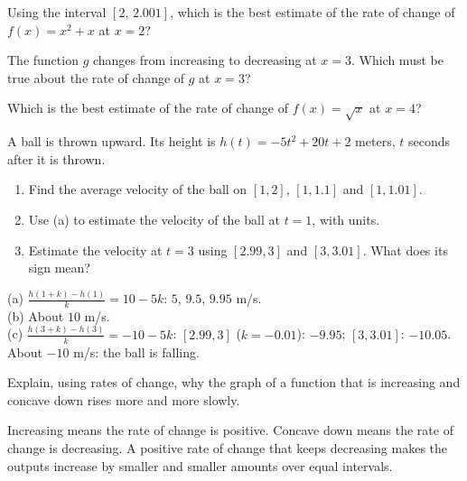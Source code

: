 \begin{exo}{}
Using the interval $[2,\,2.001]$, which is the best estimate of the rate of change of $f(x)=x^2+x$ at $x=2$?
\end{exo}
\begin{exo}{}
The function $g$ changes from increasing to decreasing at $x=3$. Which must be true about the rate of change of $g$ at $x=3$?
\end{exo}
\begin{exo}{\calcreq}
Which is the best estimate of the rate of change of $f(x)=\sqrt{x}$ at $x=4$?
\end{exo}
\begin{exo}{}
A ball is thrown upward. Its height is $h(t)=-5t^2+20t+2$ meters, $t$ seconds after it is thrown.
\begin{enumerate}[label=(\alph*)]
\item Find the average velocity of the ball on $[1,2]$, $[1,1.1]$ and $[1,1.01]$.
\item Use (a) to estimate the velocity of the ball at $t=1$, with units.
\item Estimate the velocity at $t=3$ using $[2.99,3]$ and $[3,3.01]$. What does its sign mean?
\end{enumerate}
\begin{solution}
(a) $\frac{h(1+k)-h(1)}{k}=10-5k$: $5$, $9.5$, $9.95$ m/s.\\
(b) About $10$ m/s.\\
(c) $\frac{h(3+k)-h(3)}{k}=-10-5k$: $[2.99,3]$ ($k=-0.01$): $-9.95$; $[3,3.01]$: $-10.05$. About $-10$ m/s: the ball is falling.
\end{solution}
\end{exo}
\begin{exo}{}
Explain, using rates of change, why the graph of a function that is increasing and concave down rises more and more slowly.
\begin{solution}
Increasing means the rate of change is positive. Concave down means the rate of change is decreasing. A positive rate of change that keeps decreasing makes the outputs increase by smaller and smaller amounts over equal intervals.
\end{solution}
\end{exo}

